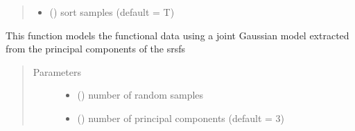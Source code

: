 \documentclass[letterpaper,10pt,english]{sphinxmanual}
\begin{document}
\begin{fulllineitems}
\begin{fulllineitems}
\begin{quote}
\begin{description}
\begin{itemize}
\item {} 
 () \textendash{} sort samples (default = T)

\end{itemize}

\end{description}\end{quote}

\end{fulllineitems}


\begin{fulllineitems}
\label{\detokenize{time_warping:time_warping.fdawarp.joint_gauss_model}}
This function models the functional data using a joint Gaussian model
extracted from the principal components of the srsfs
\begin{quote}\begin{description}
\item[{Parameters}] \leavevmode\begin{itemize}
\item {} 
 () \textendash{} number of random samples

\item {} 
 () \textendash{} number of principal components (default = 3)

\end{itemize}

\end{description}\end{quote}

\end{fulllineitems}



\end{fulllineitems}
\end{document}
